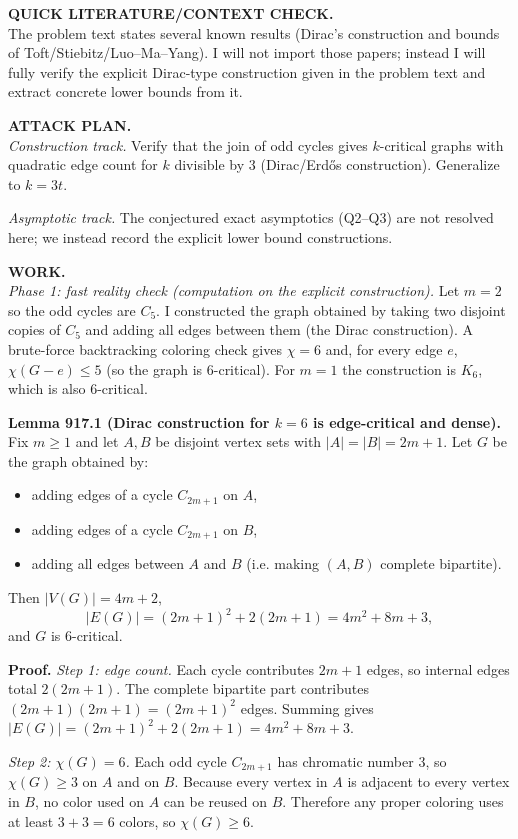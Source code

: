 \medskip
\noindent\textbf{QUICK LITERATURE/CONTEXT CHECK.}\\
The problem text states several known results (Dirac's construction and bounds of Toft/Stiebitz/Luo--Ma--Yang). I will not import those papers; instead I will fully verify the explicit Dirac-type construction given in the problem text and extract concrete lower bounds from it.

\medskip
\noindent\textbf{ATTACK PLAN.}\\
\emph{Construction track.} Verify that the join of odd cycles gives $k$-critical graphs with quadratic edge count for $k$ divisible by $3$ (Dirac/Erd\H{o}s construction). Generalize to $k=3t$.

\smallskip
\noindent\emph{Asymptotic track.} The conjectured exact asymptotics (Q2--Q3) are not resolved here; we instead record the explicit lower bound constructions.

\medskip
\noindent\textbf{WORK.}\\
\emph{Phase 1: fast reality check (computation on the explicit construction).}  Let $m=2$ so the odd cycles are $C_5$. I constructed the graph obtained by taking two disjoint copies of $C_5$ and adding all edges between them (the Dirac construction). A brute-force backtracking coloring check gives $\chi=6$ and, for every edge $e$, $\chi(G-e)\le 5$ (so the graph is $6$-critical). For $m=1$ the construction is $K_6$, which is also $6$-critical.

\medskip
\noindent\textbf{Lemma 917.1 (Dirac construction for $k=6$ is edge-critical and dense).}  Fix $m\ge 1$ and let $A,B$ be disjoint vertex sets with $|A|=|B|=2m+1$. Let $G$ be the graph obtained by:
\begin{itemize}
\item adding edges of a cycle $C_{2m+1}$ on $A$,
\item adding edges of a cycle $C_{2m+1}$ on $B$,
\item adding all edges between $A$ and $B$ (i.e. making $(A,B)$ complete bipartite).
\end{itemize}
Then $|V(G)|=4m+2$,
\[
|E(G)|=(2m+1)^2+2(2m+1)=4m^2+8m+3,
\]
and $G$ is $6$-critical.

\noindent\textbf{Proof.}
\emph{Step 1: edge count.} Each cycle contributes $2m+1$ edges, so internal edges total $2(2m+1)$. The complete bipartite part contributes $(2m+1)(2m+1)=(2m+1)^2$ edges. Summing gives $|E(G)|=(2m+1)^2+2(2m+1)=4m^2+8m+3$.

\emph{Step 2: $\chi(G)=6$.} Each odd cycle $C_{2m+1}$ has chromatic number $3$, so $\chi(G)\ge 3$ on $A$ and on $B$. Because every vertex in $A$ is adjacent to every vertex in $B$, no color used on $A$ can be reused on $B$. Therefore any proper coloring uses at least $3+3=6$ colors, so $\chi(G)\ge 6$.

